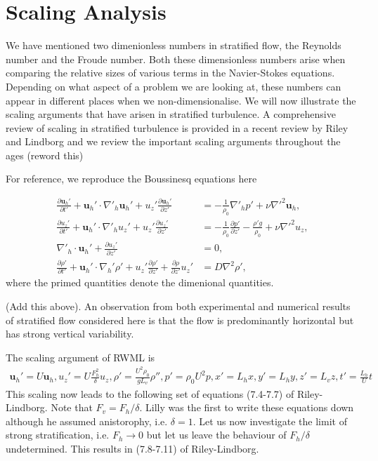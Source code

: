 \section{Scaling Analysis}
We have mentioned two dimenionless numbers in stratified flow, the Reynolds number and the Froude number. Both these dimensionless numbers arise when comparing the relative sizes of various terms in the Navier-Stokes equations. Depending on what aspect of a problem we are looking at, these numbers can appear in different places when we non-dimensionalise. We will now illustrate the scaling arguments that have arisen in stratified turbulence. A comprehensive review of scaling in stratified turbulence is provided in a recent review by Riley and Lindborg and we review the important scaling arguments throughout the ages (reword this)

For reference, we reproduce the Boussinesq equations here

\begin{align}
\frac{\partial \textbf{u}_{h}'}{\partial t'} + \textbf{u}_{h}'\cdot\nabla'_{h}\textbf{u}_{h}'+u_{z}'\frac{\partial \textbf{u}_{h}'}{\partial z'} &= -\frac{1}{\rho_{0}}\nabla'_{h}p' + \nu \nabla'^{2}\textbf{u}_{h}\label{scaling_horz},\\
\frac{\partial u_{z}'}{\partial t'} + \textbf{u}_{h}'\cdot\nabla'_{h}u_{z}'+u_{z}'\frac{\partial u_{z}'}{\partial z'} &= -\frac{1}{\rho_{0}}\frac{\partial p'}{\partial z'} - \frac{\rho' g}{\rho_{0}} + \nu \nabla'^{2}u_{z},\label{scaling_vert}\\
\nabla'_{h}\cdot\textbf{u}_{h}' + \frac{\partial u_{z}'}{\partial z'} &=0,\label{scaling_cont}\\
\frac{\partial \rho'}{\partial t'} + \textbf{u}_{h}'\cdot\nabla_{h}'\rho' + u_{z}'\frac{\partial \rho'}{\partial z'} + \frac{\partial \rho}{\partial z'}u_{z}'&=D\nabla^{2}\rho ',\label{scaling_moment}
\end{align}
where the primed quantities denote the dimenional quantities. 

(Add this above). An observation from both experimental and numerical results of stratified flow considered here is that the flow is predominantly horizontal but has strong vertical variability. 

The scaling argument of RWML is 
\begin{align}
\textbf{u}_{h}' = U\textbf{u}_{h}, u_{z}' = U\frac{F_{h}^{2}}{\delta}u_{z}, \rho' = \frac{U^{2}\rho_{0}}{gL_{v}}\rho'', p' = \rho_{0}U^{2}p, x'=L_{h}x, y'=L_{h}y, z'=L_{v}z, t'=\frac{L_{h}}{U}t
\end{align}
This scaling now leads to the following set of equations (7.4-7.7) of Riley-Lindborg. Note that $F_{v}=F_{h}/\delta$. Lilly was the first to write these equations down although he assumed anistorophy, i.e. $\delta=1$. Let us now investigate the limit of strong stratification, i.e. $F_{h}\rightarrow 0$ but let us leave the behaviour of $F_{h}/\delta$ undetermined. This results in (7.8-7.11) of Riley-Lindborg.

